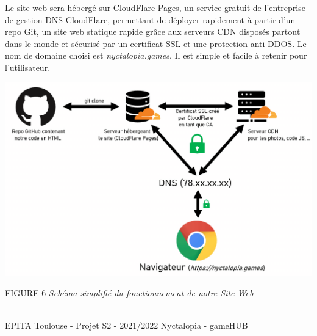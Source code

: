 Le site web sera hébergé sur CloudFlare Pages, un service gratuit de l'entreprise de gestion DNS CloudFlare, permettant de déployer rapidement à partir d'un repo Git, un site web statique rapide grâce aux serveurs CDN disposés partout dans le monde et sécurisé par un certificat SSL et une protection anti-DDOS.
Le nom de domaine choisi est \emph{nyctalopia.games}. Il est simple et facile à retenir pour l'utilisateur. 

\noindent \includegraphics[width=1\linewidth]{img/web.png}
\begin{center}
    FIGURE 6 
    \emph{Schéma simplifié du fonctionnement de notre Site Web}
    \label{fig:web}
\end{center}

\vfill
\noindent\makebox[\linewidth]{\rule{.8\paperwidth}{.6pt}}\\[0.2cm]
EPITA Toulouse - Projet S2 - 2021/2022 \hfill Nyctalopia - gameHUB
\noindent\makebox[\linewidth]{\rule{.8\paperwidth}{.6pt}}

\newpage